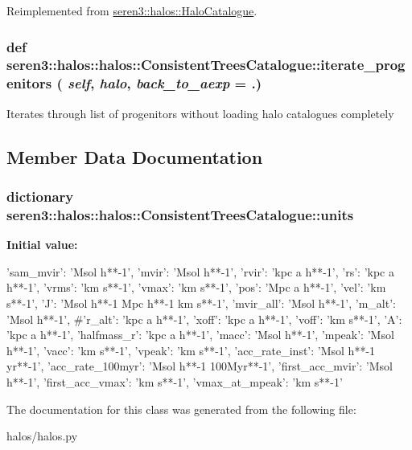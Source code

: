 Reimplemented from \hyperlink{classseren3_1_1halos_1_1HaloCatalogue}{seren3::halos::HaloCatalogue}.\hypertarget{classseren3_1_1halos_1_1halos_1_1ConsistentTreesCatalogue_a3c2a401a572e4df68cc2c744f5cca517}{
\subsubsection[{iterate\_\-progenitors}]{\setlength{\rightskip}{0pt plus 5cm}def seren3::halos::halos::ConsistentTreesCatalogue::iterate\_\-progenitors ( {\em self}, \/   {\em halo}, \/   {\em back\_\-to\_\-aexp} = {.})}}
\label{classseren3_1_1halos_1_1halos_1_1ConsistentTreesCatalogue_a3c2a401a572e4df68cc2c744f5cca517}
\begin{DoxyVerb}
Iterates through list of progenitors without loading halo catalogues completely
\end{DoxyVerb}
 

\subsection{Member Data Documentation}
\hypertarget{classseren3_1_1halos_1_1halos_1_1ConsistentTreesCatalogue_ab6b733bcb13edb2c84b2a3f3bce69397}{
\subsubsection[{units}]{\setlength{\rightskip}{0pt plus 5cm}dictionary seren3::halos::halos::ConsistentTreesCatalogue::units}}
\label{classseren3_1_1halos_1_1halos_1_1ConsistentTreesCatalogue_ab6b733bcb13edb2c84b2a3f3bce69397}
{\bfseries Initial value:}
\begin{DoxyCode}
{
        'sam_mvir': 'Msol h**-1',
        'mvir': 'Msol h**-1',
        'rvir': 'kpc a h**-1',
        'rs': 'kpc a h**-1',
        'vrms': 'km s**-1',
        'vmax': 'km s**-1',
        'pos': 'Mpc a h**-1',
        'vel': 'km s**-1',
        'J': 'Msol h**-1 Mpc h**-1 km s**-1',
        'mvir_all': 'Msol h**-1',
        'm_alt': 'Msol h**-1',
        #'r_alt': 'kpc a h**-1',
        'xoff': 'kpc a h**-1',
        'voff': 'km s**-1',
        'A': 'kpc a h**-1',
        'halfmass_r': 'kpc a h**-1',
        'macc': 'Msol h**-1',
        'mpeak': 'Msol h**-1',
        'vacc': 'km s**-1',
        'vpeak': 'km s**-1',
        'acc_rate_inst': 'Msol h**-1 yr**-1',
        'acc_rate_100myr': 'Msol h**-1 100Myr**-1',
        'first_acc_mvir': 'Msol h**-1',
        'first_acc_vmax': 'km s**-1',
        'vmax_at_mpeak': 'km s**-1'
    }
\end{DoxyCode}


The documentation for this class was generated from the following file:\begin{DoxyCompactItemize}
\item 
halos/halos.py\end{DoxyCompactItemize}
